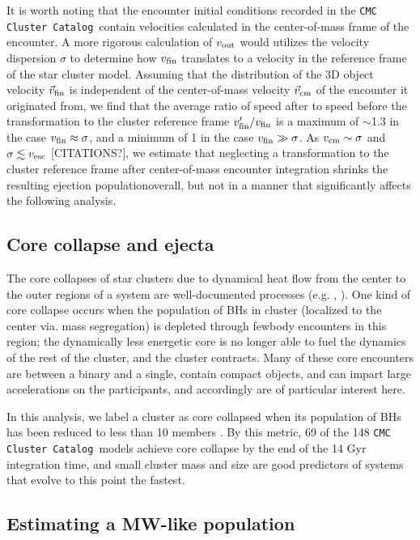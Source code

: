 \documentclass[twocolumn]{aastex631}
\newcommand{\CMCcat}{\texttt{CMC Cluster Catalog}}
\begin{document}
It is worth noting that the encounter initial conditions recorded in the \CMCcat\ contain velocities calculated in the center-of-mass frame of the encounter.
A more rigorous calculation of $v_{\rm out}$ would utilizes the velocity dispersion $\sigma$ to determine how $v_{\rm fin}$ translates to a velocity in the reference frame of the star cluster model.
Assuming that the distribution of the 3D object velocity $\vec{v}_{\rm fin}$ is independent of the center-of-mass velocity $\vec{v}_{\rm cm}$ of the encounter it originated from, we find that the average ratio of speed after to speed before the transformation to the cluster reference frame $v'_{\rm fin} / v_{\rm fin}$ is a maximum of $\sim$1.3 in the case $v_{\rm fin} \approx \sigma$, and a minimum of 1 in the case $v_{\rm fin} \gg \sigma$.
As $v_{\rm cm} \sim \sigma$ and $\sigma \lesssim v_{\rm esc}$ [CITATIONS?], we estimate that neglecting a transformation to the cluster reference frame after center-of-mass encounter integration shrinks the resulting ejection populationoverall, but not in a manner that significantly affects the following analysis.

\subsection{Core collapse and ejecta} \label{subsec:cc}

The core collapses of star clusters due to dynamical heat flow from the center to the outer regions of a system are well-documented processes (e.g. \citealt{1968MNRAS.138..495L}, \citealt{2020IAUS..351..357K}).
One kind of core collapse occurs when the population of BHs in cluster (localized to the center via. mass segregation) is depleted through fewbody encounters in this region; the dynamically less energetic core is no longer able to fuel the dynamics of the rest of the cluster, and the cluster contracts.
Many of these core encounters are between a binary and a single, contain compact objects, and can impart large accelerations on the participants, and accordingly are of particular interest here.

In this analysis, we label a cluster as core collapsed when its population of BHs has been reduced to less than 10 members \citep{2020IAUS..351..357K}.
By this metric, 69 of the 148 \CMCcat\ models achieve core collapse by the end of the 14 Gyr integration time, and small cluster mass and size are good predictors of systems that evolve to this point the fastest.

\subsection{Estimating a MW-like population} \label{subsec:est_MW-like}
\end{document}
